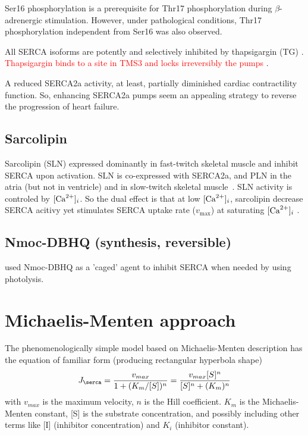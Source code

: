 \begin{framed}
  Ser16 phosphorylation is a prerequisite for Thr17 phosphorylation
  during $\beta$-adrenergic stimulation. However, under pathological
  conditions, Thr17 phosphorylation independent from Ser16 was also
  observed.
\end{framed}

All SERCA isoforms are potently and selectively inhibited by thapsigargin (TG)
\citep{lytton1991}. \textcolor{red}{Thapsigargin binds to a site in TMS3 and locks irreversibly the
pumps} \citep{sagara1992}.

\begin{framed}
  A reduced SERCA2a activity, at least, partially diminished cardiac
  contractility function. So, enhancing SERCA2a pumps seem an
  appealing strategy to reverse the progression of heart failure. 
\end{framed}

\subsection{Sarcolipin}
\label{sec:SLN_SERCA}

Sarcolipin (SLN) expressed dominantly in fast-twitch skeletal muscle and inhibit
SERCA upon activation. SLN is co-expressed with SERCA2a, and PLN in the atria (but not
in ventricle) and in slow-twitch skeletal muscle~\citep{Vangheluwe2009}. SLN
activity is controled  by $[{\text{Ca}^{2+}}]_i$. So the dual  effect is that at low
$[{\text{Ca}^{2+}}]_i$, sarcolipin decrease SERCA acitivy yet stimulates SERCA uptake rate
($v_\max$) at saturating $[{\text{Ca}^{2+}}]_i$  \citep{odermatt1997}.


\subsection{Nmoc-DBHQ (synthesis, reversible)}

\citep{Rossi1997} used Nmoc-DBHQ as a 'caged' agent to inhibit SERCA when needed
by using photolysis. 

\section{Michaelis-Menten approach}
\label{sec:mich-ment-appr}


The phenomenologically simple model based on Michaelis-Menten
description has the equation of familiar form (producing rectangular
hyperbola shape)
\begin{equation}
  \label{eq:976}
  J_\serca = \frac{v_{max}}{1+(K_m/[S])^n} = 
  \frac{v_{max}[S]^n}{[S]^n+(K_m)^n} 
\end{equation}
with $v_{max}$ is the maximum velocity, $n$ is the Hill
coefficient. $K_m$ is the Michaelis-Menten constant, [S] is the
substrate concentration, and possibly including other terms like [I]
(inhibitor concentration) and $K_i$ (inhibitor constant).

